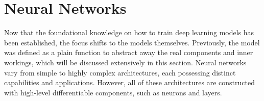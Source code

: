 \section{Neural Networks}
Now that the foundational knowledge on how to train deep learning models has
been established, the focus shifts to the models themselves. Previously, the
model was defined as a plain function to abstract away the real components and
inner workings, which will be discussed extensively in this section. Neural
networks vary from simple to highly complex architectures, each possessing
distinct capabilities and applications. However, all of these architectures are
constructed with high-level differentiable components, such as neurons and
layers.

